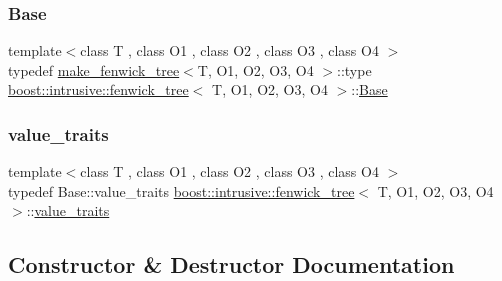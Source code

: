\subsubsection{\texorpdfstring{Base}{Base}}
{\footnotesize\ttfamily template$<$class T , class O1 , class O2 , class O3 , class O4 $>$ \\
typedef \hyperlink{structboost_1_1intrusive_1_1make__fenwick__tree}{make\+\_\+fenwick\+\_\+tree}$<$T, O1, O2, O3, O4 $>$\+::type \hyperlink{classboost_1_1intrusive_1_1fenwick__tree}{boost\+::intrusive\+::fenwick\+\_\+tree}$<$ T, O1, O2, O3, O4 $>$\+::\hyperlink{classboost_1_1intrusive_1_1fenwick__tree_a1ea48121b592add95278c215771b0f96}{Base}}

\mbox{\label{classboost_1_1intrusive_1_1fenwick__tree_aa7fcc6f3fabb763e2aed47bc0f0a073c}} 
\subsubsection{\texorpdfstring{value\+\_\+traits}{value\_traits}}
{\footnotesize\ttfamily template$<$class T , class O1 , class O2 , class O3 , class O4 $>$ \\
typedef Base\+::value\+\_\+traits \hyperlink{classboost_1_1intrusive_1_1fenwick__tree}{boost\+::intrusive\+::fenwick\+\_\+tree}$<$ T, O1, O2, O3, O4 $>$\+::\hyperlink{classboost_1_1intrusive_1_1fenwick__tree_aa7fcc6f3fabb763e2aed47bc0f0a073c}{value\+\_\+traits}}



\subsection{Constructor \& Destructor Documentation}
\mbox{\label{classboost_1_1intrusive_1_1fenwick__tree_a81e92c61c222ef9e6b3bec3a11d6b177}} 
